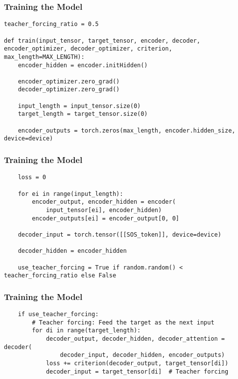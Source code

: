 \begin{frame}[fragile]
\frametitle{Training the Model}
\begin{lstlisting}    
teacher_forcing_ratio = 0.5

def train(input_tensor, target_tensor, encoder, decoder, encoder_optimizer, decoder_optimizer, criterion, max_length=MAX_LENGTH):
    encoder_hidden = encoder.initHidden()

    encoder_optimizer.zero_grad()
    decoder_optimizer.zero_grad()

    input_length = input_tensor.size(0)
    target_length = target_tensor.size(0)

    encoder_outputs = torch.zeros(max_length, encoder.hidden_size, device=device)

 \end{lstlisting} 
              
\end{frame} 

\begin{frame}[fragile]
\frametitle{Training the Model}
\begin{lstlisting}    
    loss = 0

    for ei in range(input_length):
        encoder_output, encoder_hidden = encoder(
            input_tensor[ei], encoder_hidden)
        encoder_outputs[ei] = encoder_output[0, 0]

    decoder_input = torch.tensor([[SOS_token]], device=device)

    decoder_hidden = encoder_hidden

	use_teacher_forcing = True if random.random() < teacher_forcing_ratio else False
 \end{lstlisting} 
              
\end{frame} 

\begin{frame}[fragile]
\frametitle{Training the Model}
\begin{lstlisting}    
    if use_teacher_forcing:
        # Teacher forcing: Feed the target as the next input
        for di in range(target_length):
            decoder_output, decoder_hidden, decoder_attention = decoder(
                decoder_input, decoder_hidden, encoder_outputs)
            loss += criterion(decoder_output, target_tensor[di])
            decoder_input = target_tensor[di]  # Teacher forcing

\end{lstlisting} 
              
\end{frame} 

